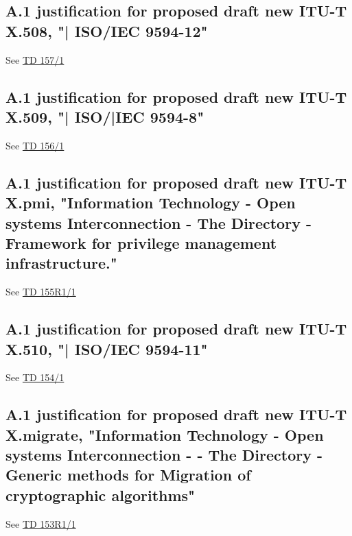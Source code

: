 \subsection*{A.1 justification for proposed draft new ITU-T X.508, "| ISO/IEC 9594-12"}
See \href{https://www.itu.int/md/meetingdoc.asp?lang=en\&parent=T25-SG17-251203-TD-WP1-0157}{TD 157/1}

\newpage

\subsection*{A.1 justification for proposed draft new ITU-T X.509, "| ISO/|IEC 9594-8"}
See \href{https://www.itu.int/md/meetingdoc.asp?lang=en\&parent=T25-SG17-251203-TD-WP1-0156}{TD 156/1}

\newpage

\subsection*{A.1 justification for proposed draft new ITU-T X.pmi, "Information Technology - Open systems Interconnection - The Directory -Framework for privilege management infrastructure."}
See \href{https://www.itu.int/md/meetingdoc.asp?lang=en\&parent=T25-SG17-251203-TD-WP1-0155}{TD 155R1/1}

\newpage

\subsection*{A.1 justification for proposed draft new ITU-T X.510, "| ISO/IEC 9594-11"}
See \href{https://www.itu.int/md/meetingdoc.asp?lang=en\&parent=T25-SG17-251203-TD-WP1-0154}{TD 154/1}

\newpage

\subsection*{A.1 justification for proposed draft new ITU-T X.migrate, "Information Technology - Open systems Interconnection - - The Directory - Generic methods for Migration of cryptographic algorithms"}
See \href{https://www.itu.int/md/meetingdoc.asp?lang=en\&parent=T25-SG17-251203-TD-WP1-0153}{TD 153R1/1}

